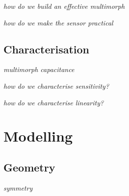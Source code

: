 \documentclass[a4paper,10pt,twocolumn]{article}
\begin{document}
\emph{how do we build an effective multimorph}

\emph{how do we make the sensor practical}

\subsection{Characterisation}

\emph{multimorph capacitance}

\emph{how do we characterise sensitivity?}

\emph{how do we characterise linearity?}

\section{Modelling}

\subsection{Geometry}

\emph{symmetry}
\end{document}
